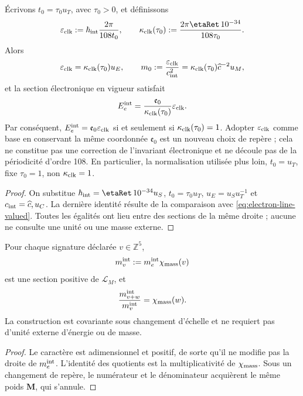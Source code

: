 \begin{proposition}
\label{prop:no-identificacion-base-reloj-rev8}
Écrivons \(t_0=\tau_0u_T\), avec \(\tau_0>0\), et définissons
\[
 \varepsilon_{\rm clk}
 :=\hbar_{\rm int}\frac{2\pi}{108t_0},
 \qquad
 \kappa_{\rm clk}(\tau_0)
 :=\frac{2\pi\etaRet\,10^{-34}}{108\tau_0}.
\]
Alors
\[
 \varepsilon_{\rm clk}=\kappa_{\rm clk}(\tau_0)u_E,
 \qquad
 m_0:=\frac{\varepsilon_{\rm clk}}{c_{\rm int}^2}
 =\kappa_{\rm clk}(\tau_0)\widehat c^{-2}u_M,
\]
et la section électronique en vigueur satisfait
\[
 E_e^{\rm int}
 =\frac{\mathfrak e_0}{\kappa_{\rm clk}(\tau_0)}
  \varepsilon_{\rm clk}.
\]
Par conséquent, \(E_e^{\rm int}=\mathfrak e_0\varepsilon_{\rm clk}\) si et seulement si
\(\kappa_{\rm clk}(\tau_0)=1\). Adopter \(\varepsilon_{\rm clk}\) comme base
en conservant la même coordonnée \(\mathfrak e_0\) est un nouveau choix de
repère ; cela ne constitue pas une correction de l'invariant électronique et ne découle pas
de la périodicité d'ordre 108. En particulier, la normalisation utilisée plus
loin, \(t_0=u_T\), fixe \(\tau_0=1\), non
\(\kappa_{\rm clk}=1\).
\end{proposition}

\begin{proof}
On substitue
\(\hbar_{\rm int}=\etaRet\,10^{-34}u_S\),
\(t_0=\tau_0u_T\), \(u_E=u_Su_T^{-1}\) et
\(c_{\rm int}=\widehat c,u_C\). La dernière identité résulte de la comparaison
avec \cref{eq:electron-line-valued}. Toutes les égalités ont lieu entre des
sections de la même droite ; aucune ne consulte une unité ou une masse externe.
\end{proof}

\begin{proposition}
Pour chaque signature déclarée \(v\in\mathbb Z^5\),
\[
 m_v^{\rm int}:=m_e^{\rm int}\chi_{\rm mass}(v)
 \]
est une section positive de \(\mathcal L_M\), et
\[
 \frac{m_{v+w}^{\rm int}}{m_v^{\rm int}}
 =\chi_{\rm mass}(w).
\]
La construction est covariante sous changement d'échelle et ne requiert pas d'unité externe
d'énergie ou de masse.
\end{proposition}

\begin{proof}
Le caractère est adimensionnel et positif, de sorte qu'il ne modifie pas la droite de
\(m_e^{\rm int}\). L'identité des quotients est la multiplicativité de
\(\chi_{\rm mass}\). Sous un changement de repère, le numérateur et le dénominateur
acquièrent le même poids \(\mathbf M\), qui s'annule.
\end{proof}

